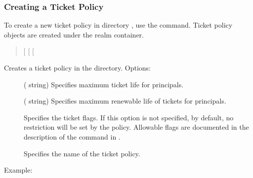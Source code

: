 \documentclass[letterpaper,10pt,english]{sphinxmanual}
\begin{document}
\subsubsection{Creating a Ticket Policy}
\label{\detokenize{admin/database:creating-a-ticket-policy}}
To create a new ticket policy in directory , use the
{\hyperref[\detokenize{admin/admin_commands/kdb5_ldap_util:kdb5-ldap-util-8}]{}}  command.  Ticket policy
objects are created under the realm container.
\begin{quote}

{[} \sphinxstyleemphasis{max\_ticket\_life}{]}
{[} \sphinxstyleemphasis{max\_renewable\_ticket\_life}{]}
{[}\sphinxstyleemphasis{ticket\_flags}{]}
\end{quote}

Creates a ticket policy in the directory.  Options:
\begin{description}
\item[{ }] \leavevmode
( string) Specifies maximum ticket life for
principals.

\item[{ }] \leavevmode
( string) Specifies maximum renewable life of
tickets for principals.

\item[{}] \leavevmode
Specifies the ticket flags.  If this option is not specified, by
default, no restriction will be set by the policy.  Allowable
flags are documented in the description of the 
command in {\hyperref[\detokenize{admin/admin_commands/kadmin_local:kadmin-1}]{}}.

\item[{}] \leavevmode
Specifies the name of the ticket policy.

\end{description}

Example:
\end{document}
